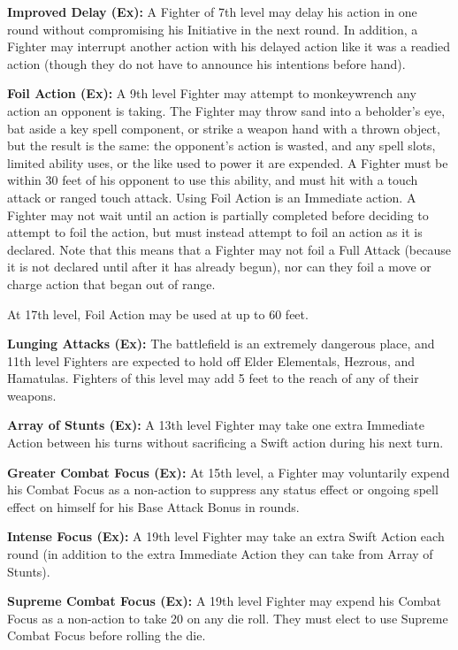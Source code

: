 \textbf{Improved Delay (Ex):} A Fighter of 7th level may delay his action in one round without compromising his Initiative in the next round. In addition, a Fighter may interrupt another action with his delayed action like it was a readied action (though they do not have to announce his intentions before hand).

\textbf{Foil Action (Ex):} A 9th level Fighter may attempt to monkeywrench any action an opponent is taking. The Fighter may throw sand into a beholder's eye, bat aside a key spell component, or strike a weapon hand with a thrown object, but the result is the same: the opponent's action is wasted, and any spell slots, limited ability uses, or the like used to power it are expended. A Fighter must be within 30 feet of his opponent to use this ability, and must hit with a touch attack or ranged touch attack. Using Foil Action is an Immediate action. A Fighter may not wait until an action is partially completed before deciding to attempt to foil the action, but must instead attempt to foil an action as it is declared. Note that this means that a Fighter may not foil a Full Attack (because it is not declared until after it has already begun), nor can they foil a move or charge action that began out of range.

At 17th level, Foil Action may be used at up to 60 feet.

\textbf{Lunging Attacks (Ex):} The battlefield is an extremely dangerous place, and 11th level Fighters are expected to hold off Elder Elementals, Hezrous, and Hamatulas. Fighters of this level may add 5 feet to the reach of any of their weapons.

\textbf{Array of Stunts (Ex):} A 13th level Fighter may take one extra Immediate Action between his turns without sacrificing a Swift action during his next turn.

\textbf{Greater Combat Focus (Ex):} At 15th level, a Fighter may voluntarily expend his Combat Focus as a non-action to suppress any status effect or ongoing spell effect on himself for his Base Attack Bonus in rounds.

\textbf{Intense Focus (Ex):} A 19th level Fighter may take an extra Swift Action each round (in addition to the extra Immediate Action they can take from Array of Stunts).

\textbf{Supreme Combat Focus (Ex):} A 19th level Fighter may expend his Combat Focus as a non-action to take 20 on any die roll. They must elect to use Supreme Combat Focus before rolling the die.
